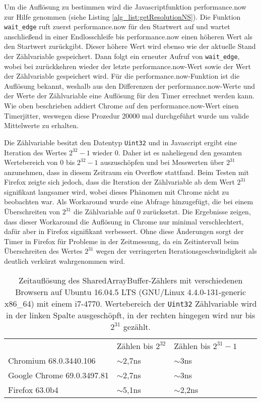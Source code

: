 Um die Auflösung zu bestimmen wird die Javascriptfunktion performance.now zur Hilfe genommen (siehe Listing \ref{alg_list:getResolutionNS}). Die Funktion \lstinline{wait_edge} ruft zuerst performance.now für den Startwert auf und wartet anschließend in einer Endlosschleife bis performance.now einen höheren Wert als den Startwert zurückgibt. 
Dieser höhere Wert wird ebenso wie der aktuelle Stand der Zählvariable gespeichert. 
Dann folgt ein erneuter Aufruf von \lstinline{wait_edge}, wobei bei zurückkehren wieder der letzte performance.now-Wert sowie der Wert der Zählvariable gespeichert wird.
Für die performance.now-Funktion ist die Auflösung bekannt, weshalb aus den Differenzen der performance.now-Werte und der Werte der Zählvariable eine Auflösung für den Timer errechnet werden kann.
Wie oben beschrieben addiert Chrome auf den performance.now-Wert einen Timerjitter, weswegen diese Prozedur 20000 mal durchgeführt wurde um valide Mittelwerte zu erhalten.

Die Zählvariable besitzt den Datentyp \lstinline{Uint32} und in Javascript ergibt eine Iteration des Wertes $2^{32}-1$ wieder 0. 
Daher ist es naheliegend den gesamten Wertebereich von 0 bis $2^{32}-1$ auszuschöpfen und bei Messwerten über $2^{31}$ anzunehmen, dass in diesem Zeitraum ein Overflow stattfand.
Beim Testen mit Firefox zeigte sich jedoch, dass die Iteration der Zählvariable ab dem Wert $2^{31}$ signifikant langsamer wird, wobei dieses Phänomen mit Chrome nicht zu beobachten war.
Als Workaround wurde eine Abfrage hinzugefügt, die bei einem Überschreiten von $2^{31}$ die Zählvariable auf 0 zurücksetzt.
Die Ergebnisse zeigen, dass dieser Workaround die Auflösung in Chrome nur minimal verschlechtert, dafür aber in Firefox signifikant verbessert.
Ohne diese Änderungen sorgt der Timer in Firefox für Probleme in der Zeitmessung, da ein Zeitintervall beim Überschreiten des Wertes $2^{31}$ wegen der verringerten Iterationsgeschwindigkeit als deutlich verkürzt wahrgenommen wird.

\label{tbl:times_res}
\begin{table}[h]
\caption{Zeitauflösung des SharedArrayBuffer-Zählers mit verschiedenen Browsern auf Ubuntu 16.04.5 LTS (GNU/Linux 4.4.0-131-generic x86_64) mit einem i7-4770. Wertebereich der \lstinline{Uint32} Zählvariable wird in der linken Spalte ausgeschöpft, in der rechten hingegen wird nur bis $2^{31}$ gezählt.}
\begin{tabular}{lllll}
                           & Zählen bis $2^{32}$ & Zählen bis $2^{31}-1$ &  &  \\[10pt]
Chromium 68.0.3440.106     & $\sim$2,7ns                      & $\sim$3ns                        &  &  \\
Google Chrome 69.0.3497.81 & $\sim$2,7ns                      & $\sim$3ns                        &  &  \\
Firefox 63.0b4             & $\sim$5,1ns                      & $\sim$2,2ns                      &  & 
\end{tabular}
\end{table}



